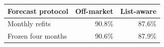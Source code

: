 \begin{tabular}{lrr}
\toprule
Forecast protocol & Off-market & List-aware \\
\midrule
Monthly refits & 90.8\% & 87.6\% \\
Frozen four months & 90.6\% & 87.9\% \\
\bottomrule
\end{tabular}
